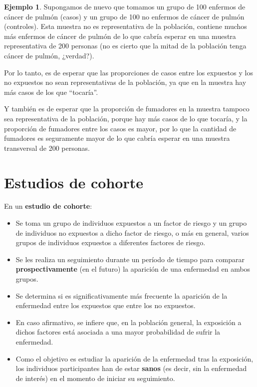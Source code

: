 \documentclass[
]{book}
\theoremstyle{definition}
\theoremstyle{definition}
\newtheorem{example}{Ejemplo}[chapter]
\theoremstyle{definition}
\theoremstyle{definition}
\theoremstyle{remark}
\begin{document}
\begin{example}
\protect\hypertarget{exm:fumadorescancer2}{}\label{exm:fumadorescancer2}Supongamos de nuevo que tomamos un grupo de 100 enfermos de cáncer de pulmón (casos) y un grupo de 100 no enfermos de cáncer de pulmón (controles). Esta muestra no es representativa de la población, contiene muchos más enfermos de cáncer de pulmón de lo que cabría esperar en una muestra representativa de 200 personas (no es cierto que la mitad de la población tenga cáncer de pulmón, ¿verdad?).
\end{example}

Por lo tanto, es de esperar que las proporciones de casos entre los expuestos y los no expuestos no sean representativas de la población, ya que en la muestra hay más casos de los que ``tocaría''.

Y también es de esperar que la proporción de fumadores en la muestra tampoco sea representativa de la población, porque hay más casos de lo que tocaría, y la proporción de fumadores entre los casos es mayor, por lo que la cantidad de fumadores es seguramente mayor de lo que cabría esperar en una muestra transversal de 200 personas.

\hypertarget{estudios-de-cohorte}{%
\section{Estudios de cohorte}\label{estudios-de-cohorte}}

En un \textbf{estudio de cohorte}:

\begin{itemize}
\item
  Se toma un grupo de individuos expuestos a un factor de riesgo y un grupo de individuos no expuestos a dicho factor de riesgo, o más en general, varios grupos de individuos expuestos a diferentes factores de riesgo.
\item
  Se les realiza un seguimiento durante un período de tiempo para comparar \textbf{prospectivamente} (en el futuro) la aparición de una enfermedad en ambos grupos.
\item
  Se determina si es significativamente más frecuente la aparición de la enfermedad entre los expuestos que entre los no expuestos.
\item
  En caso afirmativo, se infiere que, en la población general, la exposición a dichos factores está asociada a una mayor probabilidad de sufrir la enfermedad.
\item
  Como el objetivo es estudiar la aparición de la enfermedad tras la exposición, los individuos participantes han de estar \textbf{sanos} (es decir, sin la enfermedad de interés) en el momento de iniciar su seguimiento.
\end{itemize}
\end{document}

